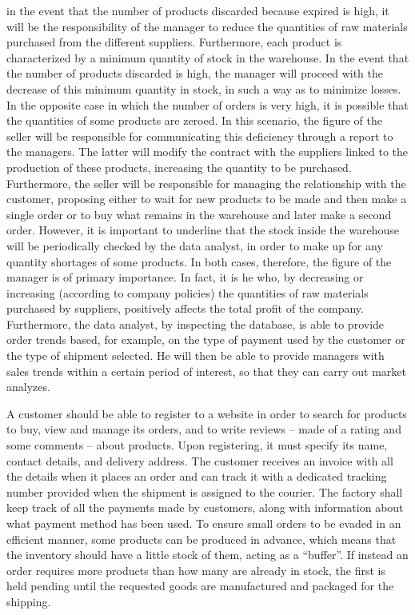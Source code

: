 in the event that the number of products discarded because expired is high, it will be the responsibility of the manager to reduce the quantities of raw materials
purchased from the different suppliers. Furthermore, each product is characterized by a minimum quantity of stock in the warehouse. In the event that the number of
products discarded is high, the manager will proceed with the decrease of this minimum quantity in stock, in such a way as to minimize losses.
In the opposite case in which the number of orders is very high, it is possible that the quantities of some products are zeroed. In this scenario, the figure of
the seller will be responsible for communicating this deficiency through a report to the managers. The latter will modify the contract with the suppliers linked
to the production of these products, increasing the quantity to be purchased. Furthermore, the seller will be responsible for managing the relationship with the customer,
proposing either to wait for new products to be made and then make a single order or to buy what remains in the warehouse and later make a second order.
However, it is important to underline that the stock inside the warehouse will be periodically checked by the data analyst, in order to make up for any quantity
shortages of some products.
In both cases, therefore, the figure of the manager is of primary importance. In fact, it is he who, by decreasing or increasing (according to company policies)
the quantities of raw materials purchased by suppliers, positively affects the total profit of the company.
Furthermore, the data analyst, by inspecting the database, is able to provide order trends based, for example, on the type of payment used by the customer or
the type of shipment selected. He will then be able to provide managers with sales trends within a certain period of interest, so that they can carry out market analyzes.

A customer should be able to register to a website in order to search for products to buy, view and manage its orders, and to write reviews -- made of a rating and
some comments -- about products. Upon registering, it must specify its name, contact details, and delivery address. The customer receives an invoice with all the
details when it places an order and can track it with a dedicated tracking number provided when the shipment is assigned to the courier. The factory shall keep track of all the payments made by customers, along with information about what payment method has been used. To ensure small orders to
be evaded in an efficient manner, some products can be produced in advance, which means that the inventory should have a little stock of them, acting as a ``buffer''.
If instead an order requires more products than how many are already in stock, the first is held pending until the requested goods are manufactured and packaged for
the shipping.

